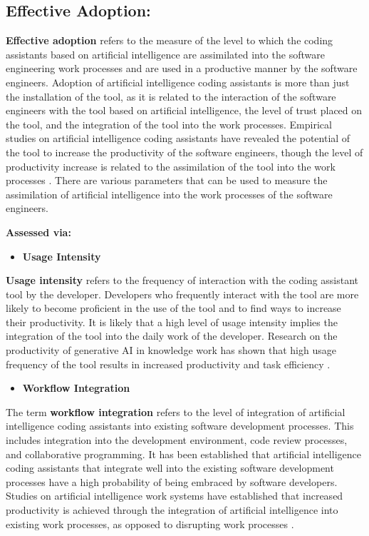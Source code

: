 \subsection {Effective Adoption: }
\label{sec:Effective Adoption}
\textbf{Effective adoption} refers to the measure of the level to which the coding assistants based on artificial intelligence are assimilated into the software engineering work processes and are used in a productive manner by the software engineers. Adoption of artificial intelligence coding assistants is more than just the installation of the tool, as it is related to the interaction of the software engineers with the tool based on artificial intelligence, the level of trust placed on the tool, and the integration of the tool into the work processes. Empirical studies on artificial intelligence coding assistants have revealed the potential of the tool to increase the productivity of the software engineers, though the level of productivity increase is related to the assimilation of the tool into the work processes \autocite{Brynjolfsson2025}. There are various parameters that can be used to measure the assimilation of artificial intelligence into the work processes of the software engineers.

\textbf{Assessed via:}

\begin{itemize}
	\item \textbf{Usage Intensity} 
\end{itemize}
\textbf{Usage intensity} refers to the frequency of interaction with the coding assistant tool by the developer. Developers who frequently interact with the tool are more likely to become proficient in the use of the tool and to find ways to increase their productivity. It is likely that a high level of usage intensity implies the integration of the tool into the daily work of the developer. Research on the productivity of generative AI in knowledge work has shown that high usage frequency of the tool results in increased productivity and task efficiency \autocite{Noy2023}.

\begin{itemize}
	\item \textbf{Workflow Integration} 
\end{itemize}
The term \textbf{workflow integration} refers to the level of integration of artificial intelligence coding assistants into existing software development processes. This includes integration into the development environment, code review processes, and collaborative programming. It has been established that artificial intelligence coding assistants that integrate well into the existing software development processes have a high probability of being embraced by software developers. Studies on artificial intelligence work systems have established that increased productivity is achieved through the integration of artificial intelligence into existing work processes, as opposed to disrupting work processes \autocite{Brynjolfsson2025}.

